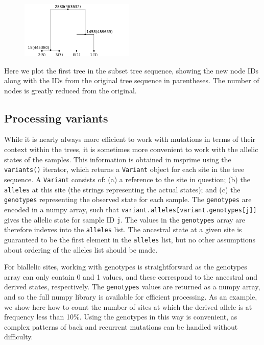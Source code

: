 \documentclass[graybox]{svmult}
\newcommand{\includenbimage}[1]{\begin{center}\texttt{[image: \#1]}\end{center}}
\begin{document}
\begin{figure}
  \begin{center}
    \includegraphics[width=0.48\textwidth]{images/processing-results_15_0}
  \end{center}
\end{figure}
Here we plot the first tree in the subset tree sequence, showing the new
node IDs along with the IDs from the original tree sequence in
parentheses. The number of nodes is greatly reduced from the original.

\subsection{Processing variants}\label{processing-variants}

While it is nearly always more efficient to work with mutations in terms
of their context within the trees, it is sometimes more convenient to
work with the allelic states of the samples. This information is
obtained in msprime using the \texttt{variants()} iterator, which
returns a \texttt{Variant} object for each site in the tree sequence. A
\texttt{Variant} consists of: (a) a reference to the site in question;
(b) the \texttt{alleles} at this site (the strings representing the
actual states); and (c) the \texttt{genotypes} representing the observed
state for each sample. The \texttt{genotypes} are encoded in a numpy
array, such that \texttt{variant.alleles{[}variant.genotypes{[}j{]}{]}}
gives the allelic state for sample ID \texttt{j}. The values in the
\texttt{genotypes} array are therefore indexes into the \texttt{alleles}
list. The ancestral state at a given site is guaranteed to be the first
element in the \texttt{alleles} list, but no other assumptions about
ordering of the alleles list should be made.

For biallelic sites, working with genotypes is straightforward as the
genotypes array can only contain 0 and 1 values, and these correspond to
the ancestral and derived states, respectively. The \texttt{genotypes}
values are returned as a numpy array, and so the full numpy library is
available for efficient processing. As an example, we show here how to
count the number of sites at which the derived allele is at frequency
less than 10\%. Using the genotypes in this way is convenient, as
complex patterns of back and recurrent mutations can be handled without
difficulty.
\end{document}
